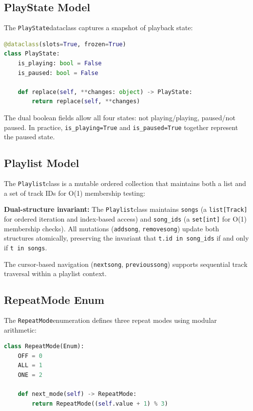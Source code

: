 \documentclass[a4paper,11pt,twoside]{article}
\newcommand{\playlist}{\texttt{Playlist}}
\newcommand{\playstate}{\texttt{PlayState}}
\newcommand{\repeatmode}{\texttt{RepeatMode}}
\DeclareRobustCommand{\method}[1]{\texttt{\def\_{\textunderscore\allowbreak}#1}}
\newcommand{\property}[1]{\texttt{#1}}
\begin{document}
\subsection{PlayState Model}

The \playstate dataclass captures a snapshot of playback state:

\begin{lstlisting}[language=Python, caption={The \playstate frozen dataclass.}]
@dataclass(slots=True, frozen=True)
class PlayState:
    is_playing: bool = False
    is_paused: bool = False

    def replace(self, **changes: object) -> PlayState:
        return replace(self, **changes)
\end{lstlisting}

The dual boolean fields allow all four states: not playing/playing,
paused/not paused. In practice, \texttt{is\_playing=True} and
\texttt{is\_paused=True} together represent the paused state.

\subsection{Playlist Model}

The \playlist class is a mutable ordered collection that maintains both a
list and a set of track IDs for O(1) membership testing:

\begin{archbox}
\textbf{Dual-structure invariant:} The \playlist class maintains
\property{songs} (a \texttt{list[Track]} for ordered iteration and
index-based access) and \property{song\_ids} (a \texttt{set[int]} for
O(1) membership checks). All mutations (\method{add\_song},
\method{remove\_song}) update both structures atomically, preserving
the invariant that \texttt{t.id in song\_ids} if and only if
\texttt{t in songs}.
\end{archbox}

The cursor-based navigation (\method{next\_song}, \method{previous\_song})
supports sequential track traversal within a playlist context.

\subsection{RepeatMode Enum}

The \repeatmode enumeration defines three repeat modes using modular arithmetic:

\begin{lstlisting}[language=Python, caption={RepeatMode enum with cycle logic.}]
class RepeatMode(Enum):
    OFF = 0
    ALL = 1
    ONE = 2

    def next_mode(self) -> RepeatMode:
        return RepeatMode((self.value + 1) % 3)
\end{lstlisting}
\end{document}
